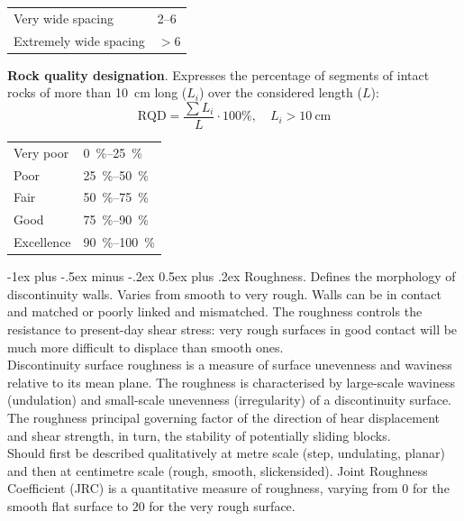 \documentclass[10pt,landscape,a4paper]{article}
\makeatletter
\renewcommand{\section}{\@startsection{section}{1}{0mm}%
	{-1ex plus -.5ex minus -.2ex}%
	{0.5ex plus .2ex}%
	{\normalfont\large\bfseries}}
\makeatother
\begin{document}
\begin{multicols}{3}
\begin{table}[H]
\begin{tabular}{ll}
				Very wide spacing & \SIrange{2}{6}{}\\
				Extremely wide spacing & $>6$\\
			\end{tabular}\end{table}
		\textbf{Rock quality designation}.
		Expresses the percentage of segments of intact rocks of more than \SI{10}{\centi\meter} long ($L_i$) over the considered length ($L$):
		\[
			\text{RQD}=\frac{\sum{L_i}}{L}\cdot100\%,\quad L_i>\SI{10}{\centi\meter}
		\]
			\begin{table}[H]\scriptsize\centering\begin{tabular}{ll}
					Very poor & \SIrange{0}{25}{\percent}\\
					Poor & \SIrange{25}{50}{\percent}\\
					Fair & \SIrange{50}{75}{\percent}\\
					Good & \SIrange{75}{90}{\percent}\\
					Excellence & \SIrange{90}{100}{\percent}\\
			\end{tabular}\end{table}
		
		\section{Roughness.}
		Defines the morphology of discontinuity walls.
		Varies from smooth to very rough.
		Walls can be in contact and matched or poorly linked and mismatched.
		The roughness controls the resistance to present-day shear stress: very rough surfaces in good contact will be much more difficult to displace than smooth ones.\\
		Discontinuity surface roughness is a measure of surface unevenness and waviness relative to its mean plane.
		The roughness is characterised by large-scale waviness (undulation) and small-scale unevenness (irregularity) of a discontinuity surface.
		The roughness principal governing factor of the direction of hear displacement and shear strength, in turn, the stability of potentially sliding blocks.\\
		Should first be described qualitatively at metre scale (step, undulating, planar) and then at centimetre scale (rough, smooth, slickensided).
		Joint Roughness Coefficient (JRC) is a quantitative measure of roughness, varying from $0$ for the smooth flat surface to $20$ for the very rough surface.
		

\end{multicols}
\end{document}
